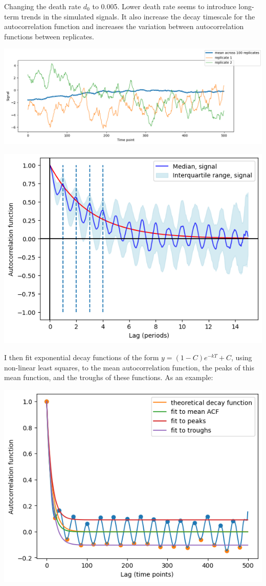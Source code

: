 \begin{enumerate}
\begin{enumerate}
\begin{enumerate}
Changing the death rate \(d_{0}\) to 0.005.  Lower death rate seems to introduce long-term trends in the simulated signals.  It also increase the decay timescale for the autocorrelation function and increases the variation between autocorrelation functions between replicates.
\begin{center}
\includegraphics[width=.9\linewidth]{gillespie_k5_d0p005_mean.png}
\end{center}
\begin{center}
\includegraphics[width=.9\linewidth]{gillespie_k5_d0p005_acf.png}
\end{center}

I then fit exponential decay functions of the form \(y = (1-C)e^{-kT}+C\), using non-linear least squares, to the mean autocorrelation function, the peaks of this mean function, and the troughs of these functions.  As an example:
\begin{center}
\includegraphics[width=.9\linewidth]{acf_fit_example.png}
\end{center}


\end{enumerate}
\end{enumerate}
\end{enumerate}
